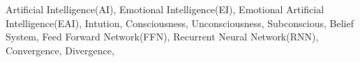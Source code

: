 Artificial Intelligence(AI), Emotional Intelligence(EI), Emotional Artificial Intelligence(EAI), Intution, Consciousness, Unconsciousness, Subconscious, Belief System, Feed Forward Network(FFN), Recurrent Neural Network(RNN), Convergence, Divergence,%